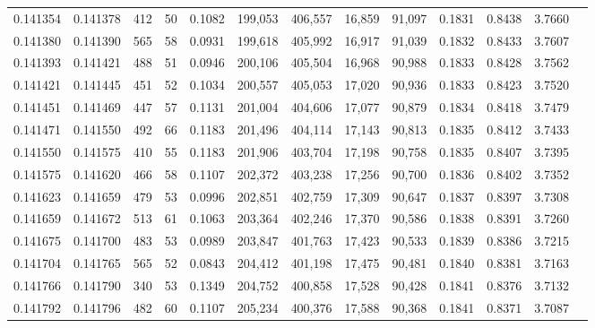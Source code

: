 \begin{tabular}{rrrrrrrrrrrrr}
0.141354 & 0.141378 &   412 &  50 &                                     0.1082 & 199,053 & 406,557 &  16,859 &  91,097 & 0.1831 & 0.8438 & 3.7660 \\
0.141380 & 0.141390 &   565 &  58 &                                     0.0931 & 199,618 & 405,992 &  16,917 &  91,039 & 0.1832 & 0.8433 & 3.7607 \\
0.141393 & 0.141421 &   488 &  51 &                                     0.0946 & 200,106 & 405,504 &  16,968 &  90,988 & 0.1833 & 0.8428 & 3.7562 \\
0.141421 & 0.141445 &   451 &  52 &                                     0.1034 & 200,557 & 405,053 &  17,020 &  90,936 & 0.1833 & 0.8423 & 3.7520 \\
0.141451 & 0.141469 &   447 &  57 &                                     0.1131 & 201,004 & 404,606 &  17,077 &  90,879 & 0.1834 & 0.8418 & 3.7479 \\
0.141471 & 0.141550 &   492 &  66 &                                     0.1183 & 201,496 & 404,114 &  17,143 &  90,813 & 0.1835 & 0.8412 & 3.7433 \\
0.141550 & 0.141575 &   410 &  55 &                                     0.1183 & 201,906 & 403,704 &  17,198 &  90,758 & 0.1835 & 0.8407 & 3.7395 \\
0.141575 & 0.141620 &   466 &  58 &                                     0.1107 & 202,372 & 403,238 &  17,256 &  90,700 & 0.1836 & 0.8402 & 3.7352 \\
0.141623 & 0.141659 &   479 &  53 &                                     0.0996 & 202,851 & 402,759 &  17,309 &  90,647 & 0.1837 & 0.8397 & 3.7308 \\
0.141659 & 0.141672 &   513 &  61 &                                     0.1063 & 203,364 & 402,246 &  17,370 &  90,586 & 0.1838 & 0.8391 & 3.7260 \\
0.141675 & 0.141700 &   483 &  53 &                                     0.0989 & 203,847 & 401,763 &  17,423 &  90,533 & 0.1839 & 0.8386 & 3.7215 \\
0.141704 & 0.141765 &   565 &  52 &                                     0.0843 & 204,412 & 401,198 &  17,475 &  90,481 & 0.1840 & 0.8381 & 3.7163 \\
0.141766 & 0.141790 &   340 &  53 &                                     0.1349 & 204,752 & 400,858 &  17,528 &  90,428 & 0.1841 & 0.8376 & 3.7132 \\
0.141792 & 0.141796 &   482 &  60 &                                     0.1107 & 205,234 & 400,376 &  17,588 &  90,368 & 0.1841 & 0.8371 & 3.7087 \\

\end{tabular}
